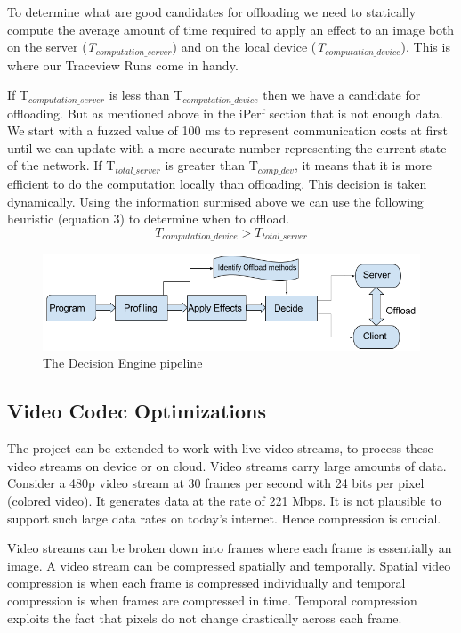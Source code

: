 \documentclass{sig-alternate}
\begin{document}
To determine what are good candidates for offloading we need to 
statically compute the average amount of time required to apply an effect to
an image both on the server ({\it T$_{computation\_server}$}) and on the local
device ({\it T$_{computation\_device}$}). This is where our Traceview Runs come in handy.

If T$_{computation\_server}$ is less than T$_{computation\_device}$ then we have a candidate
for offloading. But as mentioned above in the iPerf section that is not enough data. 
We start with a fuzzed value of 100 ms to represent communication costs at first 
until we can update with a more accurate number representing the current state of the network.
If T$_{total\_server}$ is greater than T$_{comp\_dev}$, it means that it is more
efficient to do the computation locally than offloading. This decision is taken
dynamically. Using the information surmised above we can use the 
following heuristic (equation 3) to determine when to offload.
\begin{equation}
 T_{computation\_device} > T_{total\_server}
\end{equation}

\begin{figure}[H]
\noindent \includegraphics[scale=.3]{DecisionEngine.png}
\caption{The Decision Engine pipeline}
\end{figure}

\subsection{Video Codec Optimizations}
The project can be extended to work with live video streams, to process these video streams on device or on cloud. Video streams carry large amounts of data. Consider a 480p video stream at 30 frames per second with 24 bits per pixel (colored video). It generates data at the rate of 221 Mbps. It is not plausible to support such large data rates on today's internet. Hence compression is crucial. \cite{codec}

Video streams can be broken down into frames where each frame is essentially an image. A video stream can be compressed spatially and temporally. Spatial video compression is when each frame is compressed individually and temporal compression is when frames are compressed in time. Temporal compression exploits the fact that pixels do not change drastically across each frame. \cite{codec}
\end{document}
